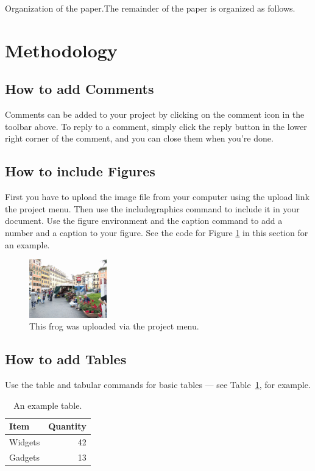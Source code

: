 \documentclass[a4paper]{article}
\begin{document}
Organization of the paper.The remainder of the paper is  organized as follows.


\section{Methodology}

\subsection{How to add Comments}

Comments can be added to your project by clicking on the comment icon in the toolbar above. %
%
%
To reply to a comment, simply click the reply button in the lower right corner of the comment, and you can close them when you're done.

\subsection{How to include Figures}

First you have to upload the image file from your computer using the upload link the project menu. Then use the includegraphics command to include it in your document. Use the figure environment and the caption command to add a number and a caption to your figure. See the code for Figure \ref{fig:frog} in this section for an example.

\begin{figure}
\centering
\includegraphics[width=0.3\textwidth]{front.jpg}
\caption{\label{fig:frog}This frog was uploaded via the project menu.}
\end{figure}

\subsection{How to add Tables}

Use the table and tabular commands for basic tables --- see Table~\ref{tab:widgets}, for example. 

\begin{table}
\centering
\begin{tabular}{l|r}
Item & Quantity \\\hline
Widgets & 42 \\
Gadgets & 13
\end{tabular}
\caption{\label{tab:widgets}An example table.}
\end{table}
\end{document}
